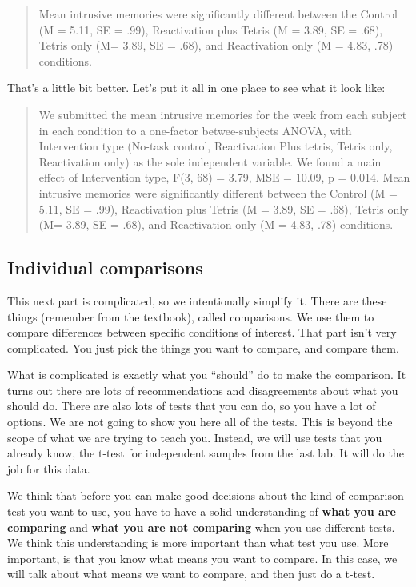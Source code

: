 \documentclass[]{book}
\theoremstyle{definition}
\theoremstyle{definition}
\theoremstyle{definition}
\theoremstyle{remark}
\begin{document}
\begin{quote}
Mean intrusive memories were significantly different between the Control
(M = 5.11, SE = .99), Reactivation plus Tetris (M = 3.89, SE = .68),
Tetris only (M= 3.89, SE = .68), and Reactivation only (M = 4.83, .78)
conditions.
\end{quote}

That's a little bit better. Let's put it all in one place to see what it
look like:

\begin{quote}
We submitted the mean intrusive memories for the week from each subject
in each condition to a one-factor betwee-subjects ANOVA, with
Intervention type (No-task control, Reactivation Plus tetris, Tetris
only, Reactivation only) as the sole independent variable. We found a
main effect of Intervention type, F(3, 68) = 3.79, MSE = 10.09, p =
0.014. Mean intrusive memories were significantly different between the
Control (M = 5.11, SE = .99), Reactivation plus Tetris (M = 3.89, SE =
.68), Tetris only (M= 3.89, SE = .68), and Reactivation only (M = 4.83,
.78) conditions.
\end{quote}

\subsection{Individual comparisons}\label{individual-comparisons}

This next part is complicated, so we intentionally simplify it. There
are these things (remember from the textbook), called comparisons. We
use them to compare differences between specific conditions of interest.
That part isn't very complicated. You just pick the things you want to
compare, and compare them.

What is complicated is exactly what you ``should'' do to make the
comparison. It turns out there are lots of recommendations and
disagreements about what you should do. There are also lots of tests
that you can do, so you have a lot of options. We are not going to show
you here all of the tests. This is beyond the scope of what we are
trying to teach you. Instead, we will use tests that you already know,
the t-test for independent samples from the last lab. It will do the job
for this data.

We think that before you can make good decisions about the kind of
comparison test you want to use, you have to have a solid understanding
of \textbf{what you are comparing} and \textbf{what you are not
comparing} when you use different tests. We think this understanding is
more important than what test you use. More important, is that you know
what means you want to compare. In this case, we will talk about what
means we want to compare, and then just do a t-test.
\end{document}
